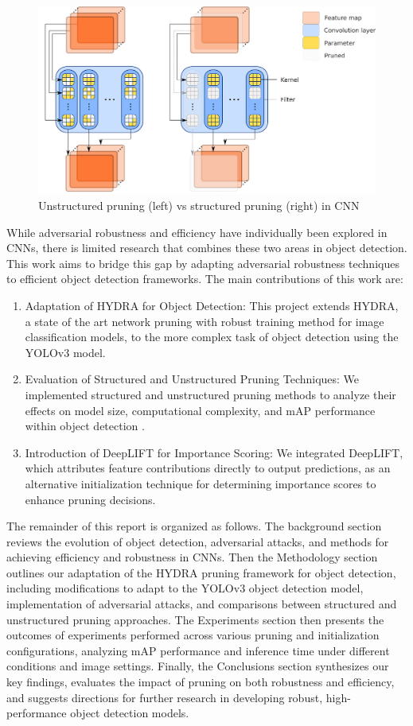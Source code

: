 \documentclass[journal,onecolumn,12pt]{IEEEtran}
\begin{document}
\begin{figure}
    \centering
    \captionsetup{justification=centering}
    \includegraphics[width=0.6\linewidth]{figures/pruning.PNG}
    \caption{Unstructured pruning (left) vs structured pruning (right) in CNN \cite{Tessier_2021}}
    \label{fig:pruning}
\end{figure}

While adversarial robustness and efficiency have individually been explored in CNNs, there is limited research that combines these two areas in object detection. This work aims to bridge this gap by adapting adversarial robustness techniques to efficient object detection frameworks. The main contributions of this work are:

\begin{enumerate}
    \item Adaptation of HYDRA for Object Detection: This project extends HYDRA, a state of the art network pruning with robust training method for image classification models, to the more complex task of object detection using the YOLOv3 model.
    \item Evaluation of Structured and Unstructured Pruning Techniques: We implemented structured and unstructured pruning methods to analyze their effects on model size, computational complexity, and mAP performance within object detection \cite{iou}.
    \item Introduction of DeepLIFT for Importance Scoring: We integrated DeepLIFT, which attributes feature contributions directly to output predictions, as an alternative initialization technique for determining importance scores to enhance pruning decisions.
\end{enumerate}

The remainder of this report is organized as follows. The background section reviews the evolution of object detection, adversarial attacks, and methods for achieving efficiency and robustness in CNNs. Then the Methodology section outlines our adaptation of the HYDRA pruning framework for object detection, including modifications to adapt to the YOLOv3 object detection model, implementation of adversarial attacks, and comparisons between structured and unstructured pruning approaches. The Experiments section then presents the outcomes of experiments performed across various pruning and initialization configurations, analyzing mAP performance and inference time under different conditions and image settings. Finally, the Conclusions section synthesizes our key findings, evaluates the impact of pruning on both robustness and efficiency, and suggests directions for further research in developing robust, high-performance object detection models.
\end{document}
